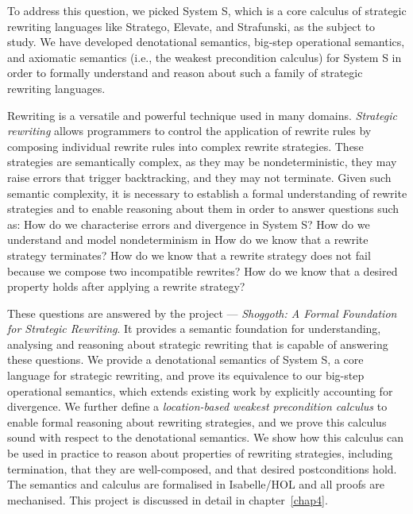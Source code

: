 To address this question, we picked System S, which is a core calculus of strategic rewriting languages like Stratego, Elevate, and Strafunski, as the subject to study. We have developed denotational semantics, big-step operational semantics, and axiomatic semantics (i.e., the weakest precondition calculus) for System S in order to formally understand and reason about such a family of strategic rewriting languages.

Rewriting is a versatile and powerful technique used in many domains.
\emph{Strategic rewriting} allows programmers to control the application of rewrite rules by composing individual rewrite rules into complex rewrite strategies. These strategies are semantically complex, as they may be nondeterministic, they may raise errors that trigger backtracking, and they may not terminate.
Given such semantic complexity, it is necessary to establish a formal understanding of rewrite strategies and to enable reasoning about them in order to answer questions such as:
How do we characterise errors and divergence in System S?
How do we understand and model nondeterminism in 
How do we know that a rewrite strategy terminates?
How do we know that a rewrite strategy does not fail because we compose two incompatible rewrites?
How do we know that a desired property holds after applying a rewrite strategy?

These questions are answered by the project --- \emph{Shoggoth: A Formal Foundation for Strategic Rewriting}. It provides a semantic foundation for understanding, analysing and reasoning about strategic rewriting that is capable of answering these questions.
We provide a denotational semantics of System S, a core language for strategic rewriting, and prove its equivalence to our big-step operational semantics, which extends existing work by explicitly accounting for divergence.
We further define a \emph{location-based weakest precondition calculus} to enable formal reasoning about rewriting strategies, and we prove this calculus sound with respect to the denotational semantics.
We show how this calculus can be used in practice to reason about properties of rewriting strategies, including termination, that they are well-composed, and that desired postconditions hold.
The semantics and calculus are formalised in Isabelle/HOL and all proofs are mechanised. This project is discussed in detail in chapter~\ref{chap4}.

